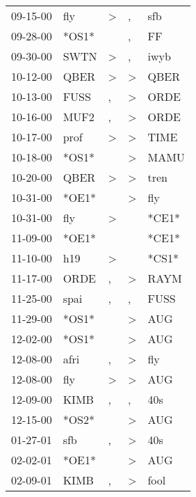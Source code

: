 \begin{supertabular}{lllll}
 09-15-00 &    fly &     \textgreater &                , &    sfb \\
 09-28-00 &  *OS1* &                  &                , &     FF \\
 09-30-00 &   SWTN &     \textgreater &                , &   iwyb \\
 10-12-00 &   QBER &     \textgreater &     \textgreater &   QBER \\
 10-13-00 &   FUSS &                , &     \textgreater &   ORDE \\
 10-16-00 &   MUF2 &                , &     \textgreater &   ORDE \\
 10-17-00 &   prof &     \textgreater &     \textgreater &   TIME \\
 10-18-00 &  *OS1* &                  &     \textgreater &   MAMU \\
 10-20-00 &   QBER &     \textgreater &     \textgreater &   tren \\
 10-31-00 &  *OE1* &                  &     \textgreater &    fly \\
 10-31-00 &    fly &     \textgreater &                  &  *CE1* \\
 11-09-00 &  *OE1* &                  &                  &  *CE1* \\
 11-10-00 &    h19 &     \textgreater &                  &  *CS1* \\
 11-17-00 &   ORDE &                , &     \textgreater &   RAYM \\
 11-25-00 &   spai &                , &                , &   FUSS \\
 11-29-00 &  *OS1* &                  &     \textgreater &    AUG \\
 12-02-00 &  *OS1* &                  &     \textgreater &    AUG \\
 12-08-00 &   afri &                , &     \textgreater &    fly \\
 12-08-00 &    fly &     \textgreater &     \textgreater &    AUG \\
 12-09-00 &   KIMB &                , &                , &    40s \\
 12-15-00 &  *OS2* &                  &     \textgreater &    AUG \\
 01-27-01 &    sfb &                , &     \textgreater &    40s \\
 02-02-01 &  *OE1* &                  &     \textgreater &    AUG \\
 02-09-01 &   KIMB &                , &     \textgreater &   fool \\

\end{supertabular}
